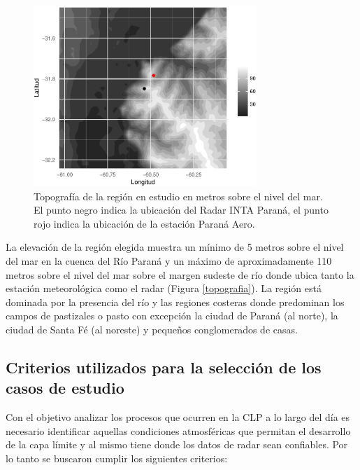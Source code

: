 \documentclass[12pt,spanish,oneside]{book}
\begin{document}
\begin{figure}

{\centering \includegraphics[width=0.75\textwidth]{Tesis_files/figure-latex/topografia-1} 

}

\caption[Topografía de la región en estudio en metros sobre el nivel del mar.]{Topografía de la región en estudio en metros sobre el nivel del mar. El punto negro indica la ubicación del Radar INTA Paraná, el punto rojo indica la ubicación de la estación Paraná Aero. \label{topografia}}\label{fig:topografia}
\end{figure}

La elevación de la región elegida muestra un mínimo de 5 metros sobre el
nivel del mar en la cuenca del Río Paraná y un máximo de aproximadamente
110 metros sobre el nivel del mar sobre el margen sudeste de río donde
ubica tanto la estación meteorológica como el radar (Figura
\ref{topografia}). La región está dominada por la presencia del río y
las regiones costeras donde predominan los campos de pastizales o pasto
con excepción la ciudad de Paraná (al norte), la ciudad de Santa Fé (al
noreste) y pequeños conglomerados de casas.

\subsection{Criterios utilizados para la selección de los casos de
estudio}\label{criterios-utilizados-para-la-seleccion-de-los-casos-de-estudio}

Con el objetivo analizar los procesos que ocurren en la CLP a lo largo
del día es necesario identificar aquellas condiciones atmosféricas que
permitan el desarrollo de la capa límite y al mismo tiene donde los
datos de radar sean confiables. Por lo tanto se buscaron cumplir los
siguientes criterios:
\end{document}
